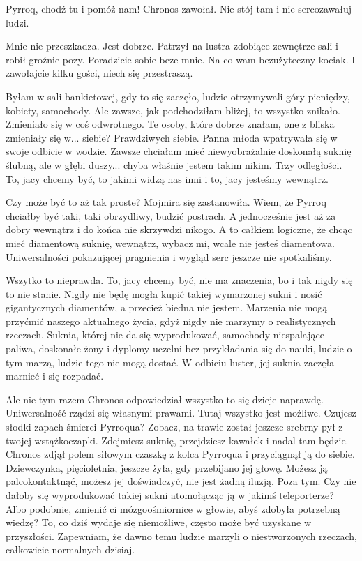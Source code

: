 \ds{} Pyrroq, chodź tu i pomóż nam! \dm{} Chronos zawołał. \dm{} Nie stój tam i nie sercozawałuj ludzi. \de{}

\ds{} Mnie nie przeszkadza. Jest dobrze. \dm{} Patrzył na lustra zdobiące zewnętrze sali i robił groźnie pozy. \dm{}
Poradzicie sobie beze mnie. Na co wam bezużyteczny kociak. I zawołajcie kilku gości, niech się przestraszą.\de{}

\ds{} Byłam w sali bankietowej, gdy to się zaczęło, ludzie otrzymywali góry pieniędzy, kobiety, samochody. Ale zawsze, jak podchodziłam bliżej, to wszystko znikało.
Zmieniało się w coś odwrotnego. Te osoby, które dobrze znałam, one z bliska zmieniały się w... siebie? Prawdziwych siebie. \dm{} Panna młoda wpatrywała się w swoje odbicie w wodzie.
\dm{} Zawsze chciałam mieć niewyobrażalnie doskonałą suknię ślubną, ale w głębi duszy... chyba właśnie jestem takim nikim. 
Trzy odległości. To, jacy chcemy być, to jakimi widzą nas inni i to, jacy jesteśmy wewnątrz. \de{}

\ds{} Czy może być to aż tak proste? \dm{} Mojmira się zastanowiła. \dm{} Wiem, że Pyrroq chciałby być taki, taki obrzydliwy, budzić postrach. 
A jednocześnie jest aż za dobry wewnątrz i do końca nie skrzywdzi nikogo. 
A to całkiem logiczne, że chcąc mieć diamentową suknię, wewnątrz, wybacz mi, wcale nie jesteś diamentowa.
Uniwersalności pokazującej pragnienia i wygląd serc jeszcze nie spotkaliśmy. \de{}

\ds{} Wszytko to nieprawda. To, jacy chcemy być, nie ma znaczenia, bo i tak nigdy się to nie stanie.
Nigdy nie będę mogła kupić takiej wymarzonej sukni i nosić gigantycznych diamentów, a przecież biedna nie jestem. 
Marzenia nie mogą przyćmić naszego aktualnego życia, gdyż nigdy nie marzymy o realistycznych rzeczach.
Suknia, której nie da się wyprodukować, samochody niespalające paliwa, doskonałe żony i dyplomy uczelni bez przykładania się do nauki, ludzie o tym marzą, ludzie tego nie mogą dostać. \dm{} 
W odbiciu luster, jej suknia zaczęła marnieć i się rozpadać. \de{}

\ds{} Ale nie tym razem \dm{} Chronos odpowiedział \dm{} wszystko to się dzieje naprawdę. Uniwersalność rządzi się własnymi prawami. Tutaj wszystko jest możliwe.
Czujesz słodki zapach śmierci Pyrroqua? Zobacz, na trawie został jeszcze srebrny pył z twojej wstążkoczapki. 
Zdejmiesz suknię, przejdziesz kawałek i nadal tam będzie. \dm{} Chronos zdjął polem siłowym czaszkę z kolca Pyrroqua i przyciągnął ją do siebie. \dm{}
Dziewczynka, pięcioletnia, jeszcze żyła, gdy przebijano jej głowę. Możesz ją palcokontaktnąć, możesz jej doświadczyć, nie jest żadną iluzją. 
Poza tym. Czy nie dałoby się wyprodukować takiej sukni atomołącząc ją w jakimś teleporterze? Albo podobnie, zmienić ci mózgoośmiornice w głowie, abyś zdobyła potrzebną wiedzę?
To, co dziś wydaje się niemożliwe, często może być uzyskane w przyszłości. Zapewniam, że dawno temu ludzie marzyli o niestworzonych rzeczach, całkowicie normalnych dzisiaj.\de{}

